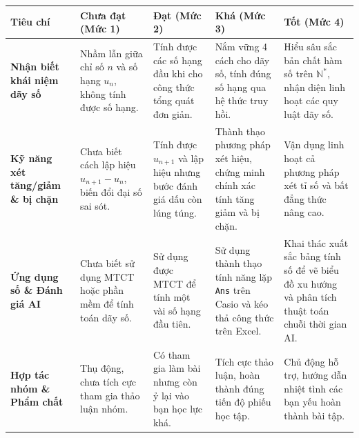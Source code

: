 \documentclass[12pt, a4paper]{article}
\begin{document}
\begin{center}  
\small  
\begin{tabularx}{\textwidth}{|p{2.8cm}|X|X|X|X|}  
\hline  
\textbf{Tiêu chí} & \textbf{Chưa đạt (Mức 1)} & \textbf{Đạt (Mức 2)} & \textbf{Khá (Mức 3)} & \textbf{Tốt (Mức 4)} \\ \hline  
\textbf{Nhận biết khái niệm dãy số} & Nhầm lẫn giữa chỉ số $n$ và số hạng $u_n$, không tính được số hạng. & Tính được các số hạng đầu khi cho công thức tổng quát đơn giản. & Nắm vững 4 cách cho dãy số, tính đúng số hạng qua hệ thức truy hồi. & Hiểu sâu sắc bản chất hàm số trên $\mathbb{N}^*$, nhận diện linh hoạt các quy luật dãy số. \\ \hline  
\textbf{Kỹ năng xét tăng/giảm \& bị chặn} & Chưa biết cách lập hiệu $u_{n+1} - u_n$, biến đổi đại số sai sót. & Tính được $u_{n+1}$ và lập hiệu nhưng bước đánh giá dấu còn lúng túng. & Thành thạo phương pháp xét hiệu, chứng minh chính xác tính tăng giảm và bị chặn. & Vận dụng linh hoạt cả phương pháp xét tỉ số và bất đẳng thức nâng cao. \\ \hline  
\textbf{Ứng dụng số \& Đánh giá AI} & Chưa biết sử dụng MTCT hoặc phần mềm để tính toán dãy số. & Sử dụng được MTCT để tính một vài số hạng đầu tiên. & Sử dụng thành thạo tính năng lặp \texttt{Ans} trên Casio và kéo thả công thức trên Excel. & Khai thác xuất sắc bảng tính số để vẽ biểu đồ xu hướng và phân tích thuật toán chuỗi thời gian AI. \\ \hline  
\textbf{Hợp tác nhóm \& Phẩm chất} & Thụ động, chưa tích cực tham gia thảo luận nhóm. & Có tham gia làm bài nhưng còn ỷ lại vào bạn học lực khá. & Tích cực thảo luận, hoàn thành đúng tiến độ phiếu học tập. & Chủ động hỗ trợ, hướng dẫn nhiệt tình các bạn yếu hoàn thành bài tập. \\ \hline  
\end{tabularx}  
\end{center}  
  
\end{document}
